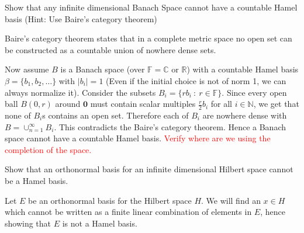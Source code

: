 \documentclass[12pt]{exam}
\theoremstyle{plain} %
\theoremstyle{definition} %
\theoremstyle{remark} %
\begin{document}
\begin{questions}
  \question
  
  \begin{solution}
    
  \end{solution}

  \question
  Show that any infinite dimensional Banach Space cannot have a countable Hamel basis (Hint: Use Baire's category theorem)
  \begin{solution}
    Baire's category theorem states that in a complete metric space no open set can be constructed as a countable union of nowhere dense sets.
    
    Now assume $B$ is a Banach space (over $\mathbb{F} = \mathbb{C} \textrm{ or } \mathbb{R}$) with a countable Hamel basis $\beta = \{ b_1, b_2, \ldots \}$ with $|b_i| = 1$ (Even if the initial choice is not of norm 1, we can always normalize it). Consider the subsets $B_i = \{ rb_i \ : \ r \in \mathbb{F} \}$.
    Since every open ball $B(0, r)$ around $\textbf{0}$ must contain scalar multiples $ \frac{r}{2}b_i $ for all $ i \in \mathbb{N}$, we get that none of $B_i$s contains an open set. Therefore each of $B_i$ are nowhere dense with $B = \cup_{n = 1}^{\infty}B_i$. This contradicts the Baire's category theorem. Hence a Banach space cannot have a countable Hamel basis. 
    \textcolor{red}{Verify where are we using the completion of the space.}
  \end{solution}

  \question
  
  \begin{solution}
    
  \end{solution}

  \question
   Show that an orthonormal basis for an infinite dimensional Hilbert space cannot be a Hamel basis.
  \begin{solution}
    Let $E$ be an orthonormal basis for the Hilbert space $H$. We will find an $x \in H$ which cannot be written as a finite linear combination of elements in $E$, hence showing that $E$ is not a Hamel basis.


\end{solution}
\end{questions}
\end{document}
